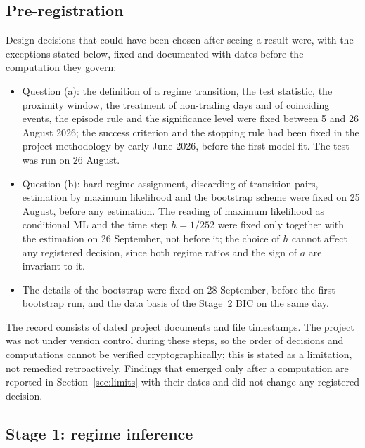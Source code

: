 \documentclass[11pt,a4paper]{article}
\begin{document}
\subsection{Pre-registration}\label{sec:prereg}

Design decisions that could have been chosen after seeing a result were, with the exceptions stated below, fixed and documented with dates before the computation they govern:
\begin{itemize}\setlength{\itemsep}{1pt}
\item Question (a): the definition of a regime transition, the test statistic, the proximity window, the treatment of non-trading days and of coinciding events, the episode rule and the significance level were fixed between 5 and 26 August 2026; the success criterion and the stopping rule had been fixed in the project methodology by early June 2026, before the first model fit. The test was run on 26 August.
\item Question (b): hard regime assignment, discarding of transition pairs, estimation by maximum likelihood and the bootstrap scheme were fixed on 25 August, before any estimation. The reading of maximum likelihood as conditional ML and the time step $h=1/252$ were fixed only together with the estimation on 26 September, not before it; the choice of $h$ cannot affect any registered decision, since both regime ratios and the sign of $a$ are invariant to it.
\item The details of the bootstrap were fixed on 28 September, before the first bootstrap run, and the data basis of the Stage~2 BIC on the same day.
\end{itemize}
The record consists of dated project documents and file timestamps. The project was not under version control during these steps, so the order of decisions and computations cannot be verified cryptographically; this is stated as a limitation, not remedied retroactively. Findings that emerged only after a computation are reported in Section~\ref{sec:limits} with their dates and did not change any registered decision.

\subsection{Stage 1: regime inference}\label{sec:stage1}
\end{document}
